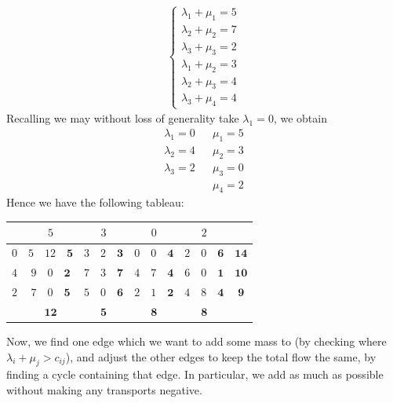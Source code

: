 \documentclass{../template/note}
\begin{document}
\begin{example*}
\begin{align*}
\begin{cases}
                \lambda_1 + \mu_1 = 5 \\
                \lambda_2 + \mu_2 = 7 \\
                \lambda_3 + \mu_3 = 2 \\
                \lambda_1 + \mu_2 = 3 \\
                \lambda_2 + \mu_3 = 4 \\
                \lambda_3 + \mu_4 = 4           
            \end{cases}
        \end{align*}
        Recalling we may without loss of generality take $\lambda_1 = 0$, we obtain
        \begin{align*}
            \lambda_1 = 0 && \mu_1 = 5 \\
            \lambda_2 = 4 && \mu_2 = 3 \\
            \lambda_3 = 2 && \mu_3 = 0 \\
            && \mu_4 = 2
        \end{align*}
        Hence we have the following tableau:
        \begin{center}    
            \begin{tabular}{| c | c | c | c | c | c |}
                \hline
                & $5$ & $3$ & $0$ & $2$ &  \\
                \hline
                $0$ & $5 \quad 12 \quad \mathbf{5}$ & $3 \quad 2 \quad \mathbf{3}$ & $0 \quad 0 \quad \mathbf{4}$ & $2 \quad 0 \quad \mathbf{6}$ & $\mathbf{14}$ \\
                $4$ & $9 \quad 0 \quad \mathbf{2}$ & $7 \quad 3 \quad \mathbf{7}$ & $4 \quad 7 \quad \mathbf{4}$ & $6 \quad 0 \quad \mathbf{1}$ & $\mathbf{10}$ \\
                $2$ & $7 \quad 0 \quad \mathbf{5}$ & $5 \quad 0 \quad \mathbf{6}$ & $2 \quad 1 \quad \mathbf{2}$ & $4 \quad 8 \quad \mathbf{4}$ & $\mathbf{9}$ \\
                \hline
                & $\mathbf{12}$ & $\mathbf{5}$ & $\mathbf{8}$ & $\mathbf{8}$ & \\
                \hline
            \end{tabular}        
        \end{center}    
        Now, we find one edge which we want to add some mass to (by checking where $\lambda_i + \mu_j > c_{ij}$), and adjust the other edges to keep the total flow the same, by finding a cycle containing that edge. In particular, we add as much as possible without making any transports negative.
    \end{example*}
    
\end{document}
